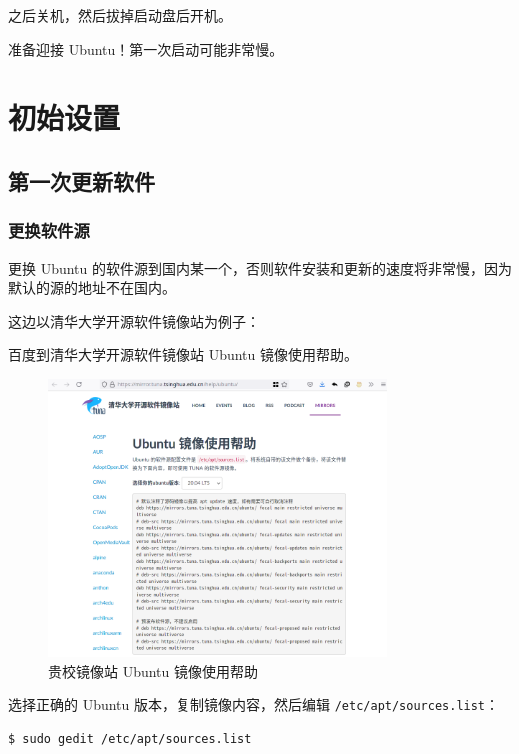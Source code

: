 \documentclass[UTF-8]{ctexart}
\begin{document}
				之后关机，然后拔掉启动盘后开机。
				
				准备迎接 Ubuntu！第一次启动可能非常慢。
			
	\newpage
		
	\section{初始设置}
	
		\subsection{第一次更新软件}
		
			\subsubsection{更换软件源}
		
				更换 Ubuntu 的软件源到国内某一个，否则软件安装和更新的速度将非常慢，因为默认的源的地址不在国内。
				
				这边以清华大学开源软件镜像站为例子：
				
				百度到清华大学开源软件镜像站 Ubuntu 镜像使用帮助。
					
				\begin{figure}[H]
					\centering
					\includegraphics[width=0.8\textwidth]{fig/ubuntu_mirror_help.png}
					\caption*{贵校镜像站 Ubuntu 镜像使用帮助}
				\end{figure}
			
				选择正确的 Ubuntu 版本，复制镜像内容，然后编辑 \texttt{/etc/apt/sources.list}：
	
				\begin{verbatim}
$ sudo gedit /etc/apt/sources.list
				\end{verbatim}
			
\end{document}
